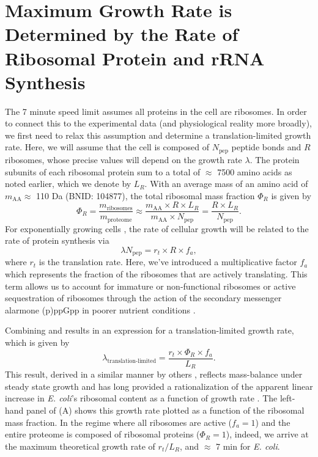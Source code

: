 \section{Maximum Growth Rate is Determined by the Rate of Ribosomal Protein and rRNA Synthesis}
\label{sec:limit}
The 7 minute speed limit assumes all
proteins in the cell are ribosomes. In order to connect this to the
experimental data (and physiological reality more broadly), we first need to relax this assumption and determine a
translation-limited growth rate. Here, we will assume that the cell is composed
of $N_\text{pep}$ peptide bonds and $R$ ribosomes, whose precise values will depend on the
growth rate $\lambda$. The protein subunits of each ribosomal protein sum to a
total of $\approx$ 7500 amino acids as noted earlier, which we denote by $L_R$.
With an average mass of an amino acid of $m_\text{AA} \approx$ 110
Da (BNID: 104877), the total ribosomal mass fraction  $\Phi_R$ is given by
\begin{equation}
  \Phi_R = \frac{m_\text{ribosomes} }{m_\text{proteome}} \approx \frac{m_\text{AA} \times R \times L_R}{m_\text{AA} \times N_\text{pep}} = \frac{R \times L_R}{N_\text{pep}}.
  \label{eq:phir}
\end{equation}
For exponentially growing cells \citep{godin2010}, the rate of cellular growth will
be related to the rate of protein synthesis via
\begin{equation}
  \lambda N_\text{pep} = r_t \times R \times f_a,
  \label{eq:lam_npep}
\end{equation}
where $r_t$ is the translation rate. Here, we've introduced a multiplicative
factor $f_a$ which represents the fraction of the ribosomes that are actively
translating. This term allows us to account for immature or
non-functional ribosomes or active sequestration of ribosomes through the action
of the secondary messenger alarmone (p)ppGpp in poorer nutrient conditions \citep{hauryliuk2015}.

Combining  and  results in an expression for a
translation-limited growth rate, which is given by
\begin{equation}
\lambda_\text{translation-limited} = \frac{r_t\times \Phi_R\times f_a}{L_R}.
\label{eq:lam_limited}
\end{equation}
This result, derived in a similar manner by others \citep{dennis2004, klumpp2013}, reflects
mass-balance under steady state growth and has long provided a rationalization
of the apparent linear increase in \textit{E. coli}'s ribosomal content as a
function of growth rate \citep{goldberger1979, dennis2004, scott2010, dai2016}. The
left-hand panel of (A) shows this growth rate plotted as a
function of the ribosomal mass fraction.  In the regime where all ribosomes are
active ($f_a = 1$) and the entire proteome is composed of ribosomal proteins
($\Phi_R = 1$), indeed, we arrive at the maximum theoretical growth rate of $r_t
/ L_R$, and $\approx$ 7 min for \textit{E. coli}.


